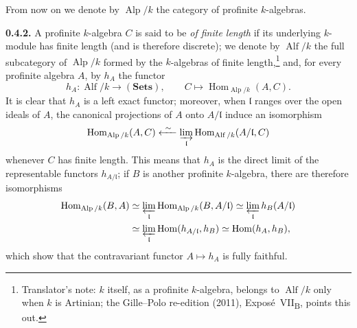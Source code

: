 From now on we denote by \(\operatorname{Alp}/k\) the category of
profinite \(k\)-algebras.

\medskip
\noindent\textbf{0.4.2.}
\label{sga3:VIIB:0.4.2}
A profinite \(k\)-algebra \(C\) is said to be \emph{of finite length} if
its underlying \(k\)-module has finite length (and is therefore discrete);
we denote by \(\operatorname{Alf}/k\) the full subcategory of
\(\operatorname{Alp}/k\) formed by the \(k\)-algebras of finite
length,\footnote{Translator's note: \(k\) itself, as a profinite \(k\)-algebra, belongs to
\(\operatorname{Alf}/k\) only when \(k\) is Artinian; the Gille--Polo re-edition (2011),
Expos\'e~VII\textsubscript{B}, points this out.} and, for every profinite algebra \(A\), by \(h_A\)
the functor
\[
  h_A:\operatorname{Alf}/k\longrightarrow(\mathbf{Sets}),
  \qquad
  C\longmapsto
  \operatorname{Hom}_{\operatorname{Alp}/k}(A,C).
\]
It is clear that \(h_A\) is a left exact functor; moreover, when
\(\mathfrak l\) ranges over the open ideals of \(A\), the canonical
projections of \(A\) onto \(A/\mathfrak l\) induce an isomorphism
\[
  \operatorname{Hom}_{\operatorname{Alp}/k}(A,C)
  \xleftarrow{\ \sim\ }
  \varinjlim_{\mathfrak l}
  \operatorname{Hom}_{\operatorname{Alf}/k}(A/\mathfrak l,C)
\]
whenever \(C\) has finite length. This means that \(h_A\) is the direct
limit of the representable functors \(h_{A/\mathfrak l}\); if \(B\) is
another profinite \(k\)-algebra, there are therefore isomorphisms
\begin{align*}
  \operatorname{Hom}_{\operatorname{Alp}/k}(B,A)
  &\simeq
  \varprojlim_{\mathfrak l}
  \operatorname{Hom}_{\operatorname{Alp}/k}(B,A/\mathfrak l)
  \simeq
  \varprojlim_{\mathfrak l}h_B(A/\mathfrak l)
  \\
  &\simeq
  \varprojlim_{\mathfrak l}
  \operatorname{Hom}(h_{A/\mathfrak l},h_B)
  \simeq
  \operatorname{Hom}(h_A,h_B),
\end{align*}
which show that the contravariant functor \(A\mapsto h_A\) is fully
faithful.

